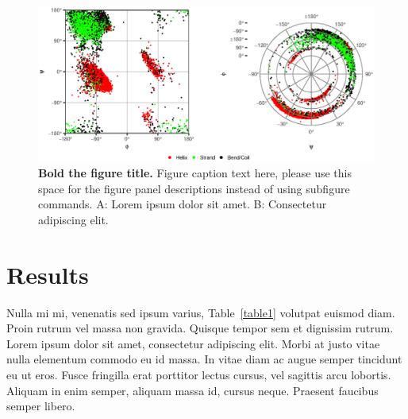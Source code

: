 \documentclass[10pt,letterpaper]{article}
\begin{document}
\begin{figure}[!h]
\includegraphics{Fig1}
\caption{{\bf Bold the figure title.}
Figure caption text here, please use this space for the figure panel descriptions instead of using subfigure commands. A: Lorem ipsum dolor sit amet. B: Consectetur adipiscing elit.}
\label{fig1}
\end{figure}

\section*{Results}
Nulla mi mi, venenatis sed ipsum varius, Table~\ref{table1} volutpat euismod diam. Proin rutrum vel massa non gravida. Quisque tempor sem et dignissim rutrum. Lorem ipsum dolor sit amet, consectetur adipiscing elit. Morbi at justo vitae nulla elementum commodo eu id massa. In vitae diam ac augue semper tincidunt eu ut eros. Fusce fringilla erat porttitor lectus cursus, vel sagittis arcu lobortis. Aliquam in enim semper, aliquam massa id, cursus neque. Praesent faucibus semper libero.
\end{document}
